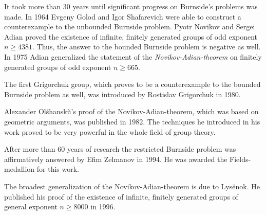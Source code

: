It took more than 30 years until significant progress on Burnside's problems was made. In 1964 Evgeny Golod and Igor Shafarevich were able to construct a counterexample to the unbounded Burnside problem. Pyotr Novikov and Sergei Adian proved the existence of infinite, finitely generated groups of odd exponent $n\geq 4381$. Thus, the answer to the bounded Burnside problem is negative as well. In 1975 Adian generalized the statement of the \emph{Novikov-Adian-theorem} on finitely generated groups of odd exponent $n\geq 665$.

The first Grigorchuk group, which proves to be a counterexample to the bounded Burnside problem as well, was introduced by Rostislav Grigorchuk in 1980.

\sloppypar
Alexander Olśhanski\u\i's proof of the Novikov-Adian-theorem, which was based on geometric arguments, was published in 1982. The techniques he introduced in his work proved to be very powerful in the whole field of group theory.

After more than 60 years of research the restricted Burnside problem was affirmatively answered by Efim Zelmanov in 1994. He was awarded the Fields-medallion for this work.

The broadest generalization of the Novikov-Adian-theorem is due to Lys\"{e}nok. He published his proof of the existence of infinite, finitely generated groups of general exponent $n\geq 8000$ in 1996.